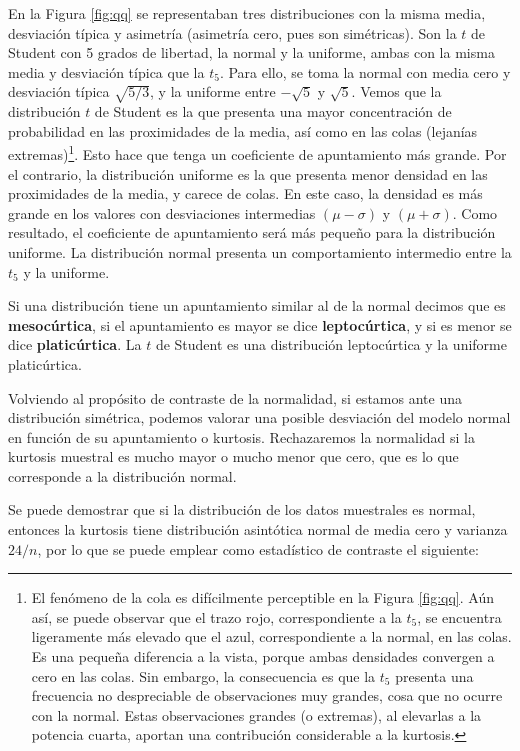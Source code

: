 \documentclass[
  a4paper,
  oneside]{scrbook}
\theoremstyle{definition}
\theoremstyle{definition}
\theoremstyle{definition}
\theoremstyle{definition}
\theoremstyle{remark}
\begin{document}
En la Figura \ref{fig:qq} se
representaban tres distribuciones con la misma media, desviación típica
y asimetría (asimetría cero, pues son simétricas). Son la \(t\) de Student
con 5 grados de libertad, la normal y la uniforme, ambas con la misma
media y desviación típica que la \(t_5\). Para ello, se toma la normal con
media cero y desviación típica \(\sqrt{5/3}\), y la uniforme entre
\(-\sqrt{5}\) y \(\sqrt{5}\). Vemos que la distribución \(t\) de Student es la
que presenta una mayor concentración de probabilidad en las proximidades
de la media, así como en las colas (lejanías extremas)\footnote{El fenómeno de la cola es difícilmente perceptible en la Figura
  \ref{fig:qq}. Aún así, se
  puede observar que el trazo rojo, correspondiente a la \(t_5\), se
  encuentra ligeramente más elevado que el azul, correspondiente a la
  normal, en las colas. Es una pequeña diferencia a la vista, porque
  ambas densidades convergen a cero en las colas. Sin embargo, la
  consecuencia es que la \(t_5\) presenta una frecuencia no despreciable
  de observaciones muy grandes, cosa que no ocurre con la normal.
  Estas observaciones grandes (o extremas), al elevarlas a la potencia
  cuarta, aportan una contribución considerable a la kurtosis.}. Esto hace
que tenga un coeficiente de apuntamiento más grande. Por el contrario,
la distribución uniforme es la que presenta menor densidad en las
proximidades de la media, y carece de colas. En este caso, la densidad
es más grande en los valores con desviaciones intermedias \((\mu-\sigma)\)
y \((\mu+\sigma)\). Como resultado, el coeficiente de apuntamiento será
más pequeño para la distribución uniforme. La distribución normal
presenta un comportamiento intermedio entre la \(t_5\) y la uniforme.

Si una distribución tiene un apuntamiento similar al de la normal
decimos que es \textbf{mesocúrtica}, si el apuntamiento es mayor se dice
\textbf{leptocúrtica}, y si es menor se dice \textbf{platicúrtica}. La \(t\) de
Student es una distribución leptocúrtica y la uniforme platicúrtica.

Volviendo al propósito de contraste de la normalidad, si estamos ante
una distribución simétrica, podemos valorar una posible desviación del
modelo normal en función de su apuntamiento o kurtosis. Rechazaremos la
normalidad si la kurtosis muestral es mucho mayor o mucho menor que
cero, que es lo que corresponde a la distribución normal.

Se puede demostrar que si la distribución de los datos muestrales es
normal, entonces la kurtosis tiene distribución asintótica normal de
media cero y varianza \(24/n\), por lo que se puede emplear como
estadístico de contraste el siguiente:
\end{document}

